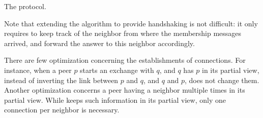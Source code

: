 \begin{algorithm}
  
  \caption{\label{algo:scamplon}The \SCAMPLON{} protocol.}
\end{algorithm}

Note that extending the algorithm to provide handshaking is not difficult: it
only requires to keep track of the neighbor from where the membership messages
arrived, and forward the answer to this neighbor accordingly.

There are few optimization concerning the establishments of connections. For
instance, when a peer $p$ starts an exchange with $q$, and $q$ has $p$ in its
partial view, instead of inverting the link between $p$ and $q$, and $q$ and
$p$, \SCAMPLON{} does not change them. Another optimization concerns a peer
having a neighbor multiple times in its partial view. While \SCAMPLON{} keeps
such information in its partial view, only one connection per neighbor is
necessary.


